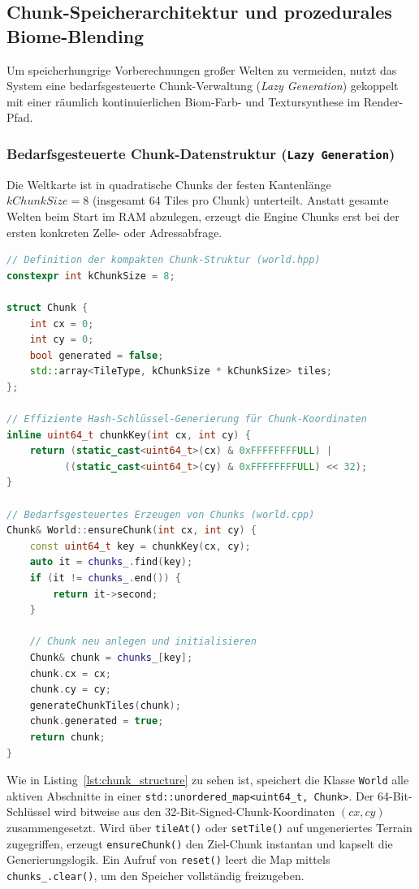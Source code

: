 \documentclass[
  a4paper,
  11pt,
  twoside,
  BCOR=8mm,           %
  headings=big,
  numbers=noenddot,
  listof=totoc,       %
  captions=tableheading,
]{scrreprt}
\begin{document}
\subsection{Chunk-Speicherarchitektur und prozedurales Biome-Blending}
\label{sec:umsetzung_chunks_blending}

Um speicherhungrige Vorberechnungen großer Welten zu vermeiden, nutzt das System eine bedarfsgesteuerte Chunk-Verwaltung (\textit{Lazy Generation}) gekoppelt mit einer räumlich kontinuierlichen Biom-Farb- und Textursynthese im Render-Pfad.

\subsubsection{Bedarfsgesteuerte Chunk-Datenstruktur (\texttt{Lazy Generation})}
Die Weltkarte ist in quadratische Chunks der festen Kantenlänge $kChunkSize = 8$ (insgesamt 64 Tiles pro Chunk) unterteilt. Anstatt gesamte Welten beim Start im RAM abzulegen, erzeugt die Engine Chunks erst bei der ersten konkreten Zelle- oder Adressabfrage.

\begin{lstlisting}[language=C++, caption={Chunk-Speicherstruktur und Lazy-Loading-Mechanismus in \texttt{world.hpp} und \texttt{world.cpp}}, label={lst:chunk_structure}]
// Definition der kompakten Chunk-Struktur (world.hpp)
constexpr int kChunkSize = 8;

struct Chunk {
    int cx = 0;
    int cy = 0;
    bool generated = false;
    std::array<TileType, kChunkSize * kChunkSize> tiles;
};

// Effiziente Hash-Schlüssel-Generierung für Chunk-Koordinaten
inline uint64_t chunkKey(int cx, int cy) {
    return (static_cast<uint64_t>(cx) & 0xFFFFFFFFULL) | 
          ((static_cast<uint64_t>(cy) & 0xFFFFFFFFULL) << 32);
}

// Bedarfsgesteuertes Erzeugen von Chunks (world.cpp)
Chunk& World::ensureChunk(int cx, int cy) {
    const uint64_t key = chunkKey(cx, cy);
    auto it = chunks_.find(key);
    if (it != chunks_.end()) {
        return it->second;
    }

    // Chunk neu anlegen und initialisieren
    Chunk& chunk = chunks_[key];
    chunk.cx = cx;
    chunk.cy = cy;
    generateChunkTiles(chunk);
    chunk.generated = true;
    return chunk;
}
\end{lstlisting}

Wie in Listing~\ref{lst:chunk_structure} zu sehen ist, speichert die Klasse \texttt{World} alle aktiven Abschnitte in einer \texttt{std::unordered\_map<uint64\_t, Chunk>}. Der 64-Bit-Schlüssel wird bitweise aus den 32-Bit-Signed-Chunk-Koordinaten $(cx, cy)$ zusammengesetzt. Wird über \texttt{tileAt()} oder \texttt{setTile()} auf ungeneriertes Terrain zugegriffen, erzeugt \texttt{ensureChunk()} den Ziel-Chunk instantan und kapselt die Generierungslogik. Ein Aufruf von \texttt{reset()} leert die Map mittels \texttt{chunks\_.clear()}, um den Speicher vollständig freizugeben.
\end{document}
